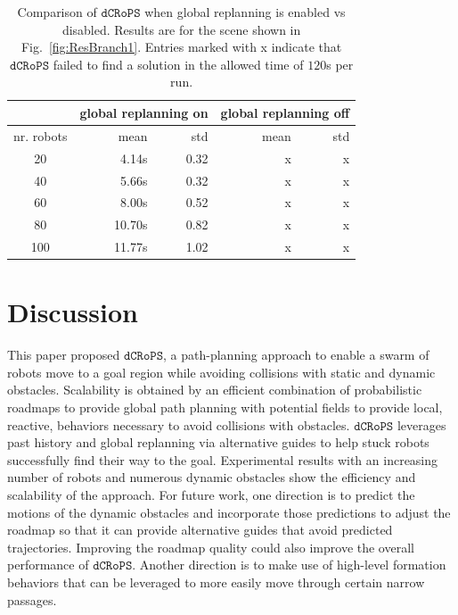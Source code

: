 \documentclass[letterpaper, 10pt, conference]{ieeeconf}
\newcommand{\Acronym}[1]{\ensuremath{{{\texttt{#1}}}}}
\newcommand{\Name}{\Acronym{dCRoPS}}
\begin{document}
\begin{table}
\centering
\begin{tabular}{c||r|r||r|r}
   & \multicolumn{2}{c||}{global replanning on} &
  \multicolumn{2}{c}{global replanning off}\\\hline
nr. robots & mean & std & mean & std\\
20 & 4.14s & 0.32 & x & x\\
40 & 5.66s & 0.32 & x & x\\
60 & 8.00s & 0.52 & x & x\\
80 & 10.70s & 0.82 & x & x\\
100 & 11.77s & 1.02 & x & x
\end{tabular}
\caption{Comparison of $\Name$ when global replanning is enabled vs
  disabled. Results are for the scene shown in
  Fig.~\ref{fig:ResBranch1}. Entries marked with x indicate that
  $\Name$ failed to find a solution in the allowed time of $120$s per
  run.}
\label{table:ResBranch2}
\end{table}

\section{Discussion}

This paper proposed $\Name$, a path-planning approach to enable a
swarm of robots move to a goal region while avoiding collisions with
static and dynamic obstacles. Scalability is obtained by an efficient
combination of probabilistic roadmaps to provide global path planning
with potential fields to provide local, reactive, behaviors necessary
to avoid collisions with obstacles. $\Name$ leverages past history and
global replanning via alternative guides to help stuck robots successfully find
their way to the goal. Experimental results with an increasing number
of robots and numerous dynamic obstacles show the efficiency and
scalability of the approach.  For future work, one direction is to
predict the motions of the dynamic obstacles and incorporate those
predictions to adjust the roadmap so that it can provide alternative
guides that avoid predicted trajectories. Improving the roadmap
quality could also improve the overall performance of $\Name$. Another
direction is to make use of high-level formation behaviors that can be
leveraged to more easily move through certain narrow passages.



\end{document}
